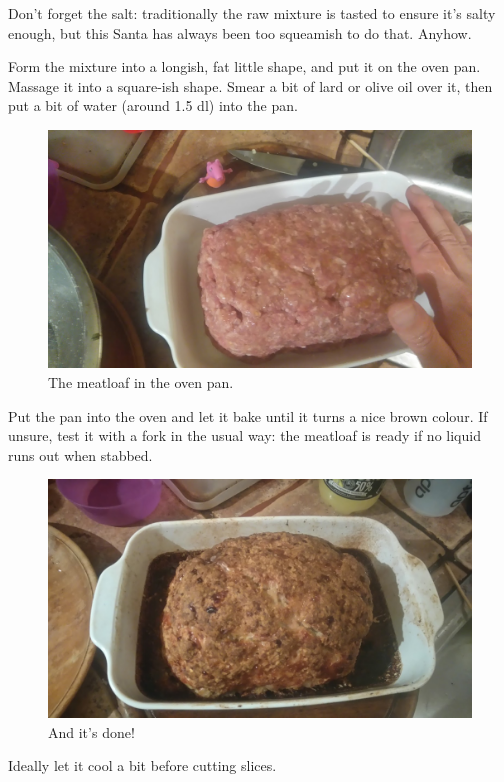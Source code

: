\documentclass{article}
\begin{document}
Don't forget the salt: traditionally the raw mixture is tasted to ensure it's salty enough, but this Santa has always been too squeamish to do that. Anyhow.

Form the mixture into a longish, fat little shape, and put it on the oven pan. Massage it into a square-ish shape. Smear a bit of lard or olive oil over it, then put a bit of water (around 1.5 dl) into the pan. 

\begin{figure}[!htbp]
\includegraphics[width=\textwidth]{meatloaf_13}
\caption{The meatloaf in the oven pan.}
\end{figure}

Put the pan into the oven and let it bake until it turns a nice brown colour. If unsure, test it with a fork in the usual way: the meatloaf is ready if no liquid runs out when stabbed.

\begin{figure}[!htbp]
\includegraphics[width=\textwidth]{meatloaf_17}
\caption{And it's done!}
\end{figure}

Ideally let it cool a bit before cutting slices.
\end{document}
